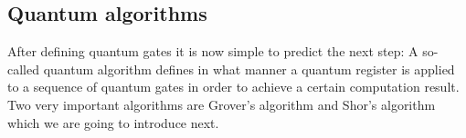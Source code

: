 \documentclass[bibliography=totocnumbered, 10pt]{article}
\theoremstyle{NoticeStyle}
\begin{document}


\subsection{Quantum algorithms}\label{sec:Quantum algorithms}

After defining quantum gates it is now simple to predict the next step: A so-called quantum algorithm defines in what manner a quantum register is applied to a sequence of quantum gates in order to achieve a certain computation result. Two very important algorithms are Grover's algorithm and Shor's algorithm which we are going to introduce next.


\end{document}
